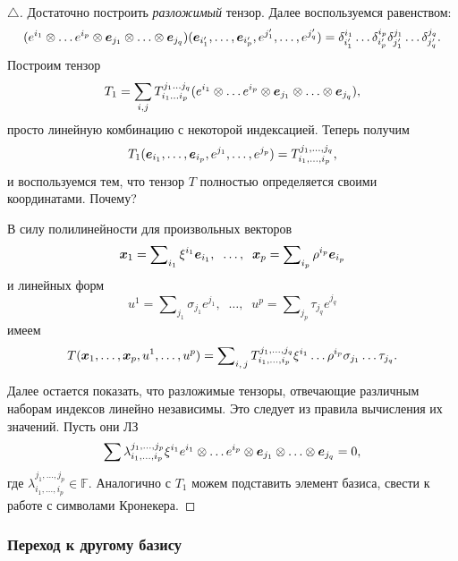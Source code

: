 \begin{proof}[$\triangle$]
Достаточно построить \textit{разложимый} тензор. Далее воспользуемся равенством:
$$
    (e^{i_{1}} \otimes \ldots e^{i_p} \otimes \mbox{\boldmath $e$}_{j_{1}} \otimes \ldots \otimes \mbox{\boldmath $e$}_{j_q}) (\mbox{\boldmath $e$}_{i_{1}'},  \ldots,  \mbox{\boldmath $e$}_{i_p'}, e^{j_1'}, \ldots,  e^{j_q'}) =
     \delta_{i_1'}^{i_{1}} \ldots \delta_{i_p'}^{i_{p}}
     \delta_{j_1'}^{j_{1}} \ldots \delta_{j_q'}^{j_{q}}.
$$
Построим тензор
$$
    T_{1} = \sum_{i, j} T_{i_1 \ldots i_p}^{j_1 \ldots  j_q} 
    (e^{i_{1}} \otimes \ldots e^{i_p} \otimes \mbox{\boldmath $e$}_{j_{1}} \otimes \ldots \otimes \mbox{\boldmath $e$}_{j_q}),
$$
просто линейную комбинацию с некоторой индексацией. Теперь получим
\begin{equation*}
    T_1(\mbox{\boldmath $e$}_{i_1}, \dots, \mbox{\boldmath $e$}_{i_p}, e^{j_1}, \dots, e^{j_p}) = T_{i_1, \dots, i_p}^{j_1, \dots, j_q},
\end{equation*}
и воспользуемся тем, что тензор $T$ полностью определяется своими координатами. Почему? 

В силу полилинейности для произвольных векторов
$$
    \mbox{\boldmath $x$}_{1} = \sum\nolimits_{i_{1}} \xi^{i_{1}} \mbox{\boldmath $e$}_{i_{1}}, \; \;
    \ldots, \; \;
    \mbox{\boldmath $x$}_p = \sum\nolimits_{i_p} \rho^{i_p} \mbox{\boldmath $e$}_{i_p}
$$
и линейных форм
$$
    u^1 = \sum\nolimits_{j_{1}} \sigma_{j_{1}} e^{j_{1}}, \; \;
    \ldots, \; \;
    u^p = \sum\nolimits_{j_p} \tau_{j_q} e^{j_q}
$$
имеем   
$$
    T(\mbox{\boldmath $x$}_{1}, \ldots,  \mbox{\boldmath $x$}_p, u^1, \ldots,  u^p) = \sum\nolimits_{i, \, j}
    T_{i_1, \dots, i_p}^{j_1, \dots, j_q} \xi^{i_{1}} \ldots \rho^{i_p} \sigma_{j_{1}} \ldots \tau_{j_q}.
$$


Далее остается показать, что разложимые тензоры, отвечающие различным наборам индексов линейно независимы. Это следует из правила вычисления их значений. Пусть они ЛЗ
$$
    \sum \lambda_{i_1, \dots, i_p}^{j_1, \dots, j_p} \xi^{i_{1}} 
    e^{i_{1}} \otimes \ldots e^{i_p} \otimes \mbox{\boldmath $e$}_{j_{1}} \otimes \ldots \otimes \mbox{\boldmath $e$}_{j_q} = 0,
$$
где $\lambda_{i_1, \dots, i_p}^{j_1, \dots, j_p} \in \mathbb{F}$. Аналогично с $T_1$ можем подставить элемент базиса, свести к работе с символами Кронекера. 

\end{proof}


\subsubsection{Переход к другому базису}

